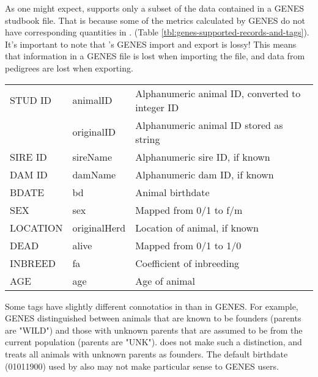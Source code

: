 As one might expect, \PyPedal{} supports only a subset of the data contained in a GENES studbook file. That is because
some of the metrics calculated by GENES do not have corresponding quantities in \PyPedal{}. (Table
\ref{tbl:genes-supported-records-and-tags}). It's important to note that \PyPedal{}'s GENES import and export is
lossy! This means that information in a GENES file is lost when importing the file, and data from \PyPedal{} pedigrees
are lost when exporting.
\begin{center}
    \tablelasttail{\hline}
    \label{tbl:genes-supported-records-and-tags}
    \begin{xtabular}{l|p{1in}|p{3in}}
    STUD ID & animalID & Alphanumeric animal ID, converted to integer ID \\
     & originalID & Alphanumeric animal ID stored as string \\
    SIRE ID & sireName & Alphanumeric sire ID, if known \\
    DAM ID & damName & Alphanumeric dam ID, if known \\
    BDATE & bd & Animal birthdate \\
    SEX & sex & Mapped from 0/1 to f/m \\
    LOCATION & originalHerd & Location of animal, if known \\
    DEAD & alive & Mapped from 0/1 to 1/0 \\
    INBREED & fa & Coefficient of inbreeding \\
    AGE & age & Age of animal \\
    \end{xtabular}
\end{center}
Some tags have slightly different connotatios in \PyPedal{} than in GENES. For example, GENES distinguished between
animals that are known to be founders (parents are "WILD") and those with unknown parents that are assumed to be
from the current population (parents are "UNK"). \PyPedal{} does not make such a distinction, and treats all animals
with unknown parents as founders. The default birthdate (01011900) used by \PyPedal{} also may not make particular
sense to GENES users.

